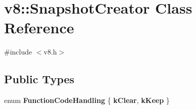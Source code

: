 \hypertarget{classv8_1_1SnapshotCreator}{}\section{v8\+:\+:Snapshot\+Creator Class Reference}
\label{classv8_1_1SnapshotCreator}


{\ttfamily \#include $<$v8.\+h$>$}

\subsection*{Public Types}
\begin{DoxyCompactItemize}
\item 
\mbox{\label{classv8_1_1SnapshotCreator_a8b1f50812dc699d0dce347fd557b77c2}} 
enum {\bfseries Function\+Code\+Handling} \{ {\bfseries k\+Clear}, 
{\bfseries k\+Keep}
 \}
\end{DoxyCompactItemize}
